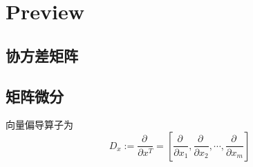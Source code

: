 \chapter{Preview}

\section{协方差矩阵}

\section{矩阵微分}

向量偏导算子为
\begin{equation}
    D_x:=\frac{\partial\ }{\partial x^T}=[\frac{\partial\ }{\partial x_1},\frac{\partial\ }{\partial x_2},\cdots,\frac{\partial\ }{\partial x_m}]
\end{equation}